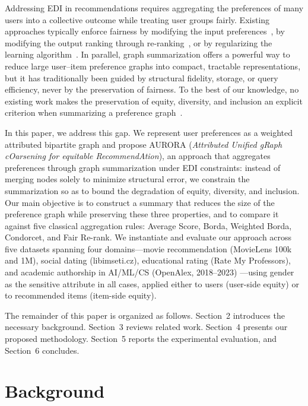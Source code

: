 \documentclass[a4paper,fleqn]{cas-dc}
\begin{document}
Addressing EDI in recommendations requires aggregating the preferences of many
users into a collective outcome while treating user groups fairly. Existing
approaches typically enforce fairness by modifying the input
preferences~\cite{kamiran2012data}, by modifying the output ranking through
re-ranking~\cite{singh2018fairness}, or by regularizing the learning
algorithm~\cite{zhao_fairness_2024}. In parallel, graph summarization offers a
powerful way to reduce large user--item preference graphs into compact, tractable
representations, but it has traditionally been guided by structural fidelity,
storage, or query efficiency, never by the preservation of fairness. To the best
of our knowledge, no existing work makes the preservation of equity, diversity,
and inclusion an explicit criterion when summarizing a preference
graph~\cite{liu_graph_2018}.

In this paper, we address this gap. We represent user preferences as a
weighted attributed bipartite graph and propose AURORA (\textit{Attributed Unified gRaph cOarsening
for equitable RecommendAtion}), an approach that aggregates
preferences through graph summarization under EDI constraints: instead of merging nodes solely
to minimize structural error, we constrain the summarization so as to bound
the degradation of equity, diversity, and inclusion. Our main objective is
to construct a summary that reduces the size of the preference graph while
preserving these three properties, and to compare it against five classical
aggregation rules: Average Score, Borda, Weighted Borda, Condorcet, and
Fair Re-rank. We instantiate and evaluate our approach across five datasets
spanning four domains—movie recommendation (MovieLens 100k~\cite{harper2015movielens}
and 1M), social dating (libimseti.cz), educational rating (Rate My
Professors), and academic authorship in AI/ML/CS (OpenAlex, 2018--2023)
—using gender as the sensitive attribute in all cases, applied either
to users (user-side equity) or to recommended items (item-side equity).

The remainder of this paper is organized as follows. Section~2 introduces
the necessary background. Section~3 reviews related work. Section~4 presents
our proposed methodology. Section~5 reports the experimental evaluation,
and Section~6 concludes.




\section{Background}
\label{sec:background}
\end{document}
